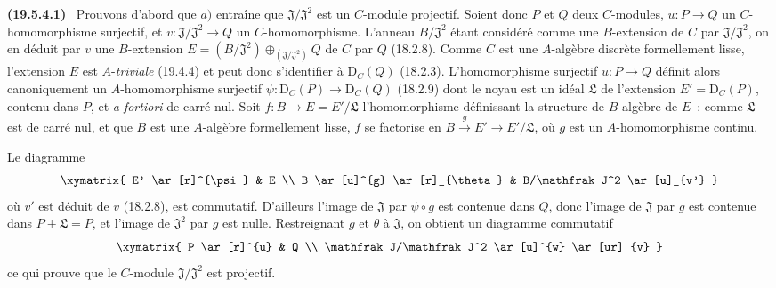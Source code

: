 \documentclass[10pt,oneside]{book}
\makeatletter
\newcommand{\setmanualcurrentlabel}[1]{\def\@currentlabel{#1}}
\newcommand{\oldpage}[2][]{%
  \setcounter{footnote}{0}%
  \marginpar{\scriptsize\textbf{#1}~|~#2}\ignorespaces}
\newenvironment{env}[1][]{\setmanualcurrentlabel{#1}\par\medskip\noindent\textbf{(#1)}\ }{\par}
\makeatother
\begin{document}
\begin{env}[19.5.4.1]
\label{0.19.5.4.1-fr}
Prouvons d'abord que $a)$ entraîne que $\mathfrak J/\mathfrak J^2$ est un
$C$-module projectif. Soient donc $P$ et $Q$ deux $C$-modules,
$u:P\to Q$ un $C$-homomorphisme surjectif, et
$v:\mathfrak J/\mathfrak J^2\to Q$ un $C$-homomorphisme. L'anneau
$B/\mathfrak J^2$ étant considéré comme une $B$-extension de $C$ par
$\mathfrak J/\mathfrak J^2$, on en déduit par $v$ une $B$-extension
$E=(B/\mathfrak J^2)\oplus_{(\mathfrak J/\mathfrak J^2)}Q$ de $C$ par $Q$
(18.2.8). Comme $C$ est une $A$-algèbre discrète formellement lisse,
l'extension $E$ est $A$-\emph{triviale} (19.4.4) et peut donc s'identifier à
$\mathrm D_C(Q)$ (18.2.3). L'homomorphisme surjectif $u:P\to Q$ définit alors
canoniquement un $A$-homomorphisme surjectif
$\psi:\mathrm D_C(P)\to\mathrm D_C(Q)$ (18.2.9) dont le noyau est un idéal
$\mathfrak L$ de l'extension $E'=\mathrm D_C(P)$, contenu dans $P$, et
\emph{a fortiori} de carré nul. Soit $f:B\to E=E'/\mathfrak L$
l'homomorphisme définissant la structure de $B$-algèbre de $E$~: comme
$\mathfrak L$ est de carré nul, et que $B$ est une $A$-algèbre formellement
lisse, $f$ se factorise en $B\xrightarrow{g}E'\to E'/\mathfrak L$, où $g$ est
un $A$-homomorphisme continu.

\oldpage[0\textsubscript{IV-1}]{92}

Le diagramme
\[
  \xymatrix{
    E' \ar[r]^{\psi} & E \\
    B \ar[u]^{g} \ar[r]_{\theta} & B/\mathfrak J^2 \ar[u]_{v'}
  }
\]
où $v'$ est déduit de $v$ (18.2.8), est commutatif. D'ailleurs l'image de
$\mathfrak J$ par $\psi\circ g$ est contenue dans $Q$, donc l'image de
$\mathfrak J$ par $g$ est contenue dans $P+\mathfrak L=P$, et l'image de
$\mathfrak J^2$ par $g$ est nulle. Restreignant $g$ et $\theta$ à
$\mathfrak J$, on obtient un diagramme commutatif
\[
  \xymatrix{
    P \ar[r]^{u} & Q \\
    \mathfrak J/\mathfrak J^2 \ar[u]^{w} \ar[ur]_{v}
  }
\]
ce qui prouve que le $C$-module $\mathfrak J/\mathfrak J^2$ est projectif.
\end{env}
\end{document}
